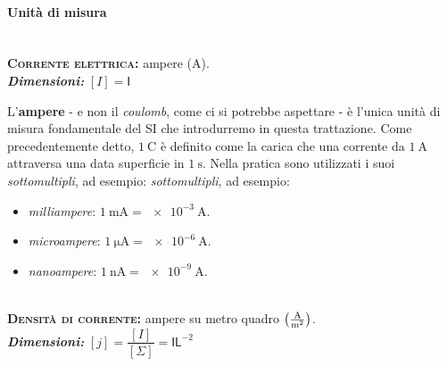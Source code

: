 \paragraph{Unità di misura}
\begin{units}~\\
	\textbf{\textsc{Corrente elettrica:}} ampere ($\unit{\ampere}$).\\
	\textit{\textbf{Dimensioni:}} $[I]=\mathsf{I}$
\end{units}
\noindent L'\textbf{ampere} - e non il \textit{coulomb}, come ci si potrebbe aspettare - è l'unica unità di misura fondamentale del SI che introdurremo in questa trattazione. Come precedentemente detto, $\SI{1}{\coulomb}$ è definito come la carica che una corrente da $\SI{1}{\ampere}$ attraversa una data superficie in $\SI{1}{\second}$.
Nella pratica sono utilizzati i suoi \textit{sottomultipli}, ad esempio:
\textit{sottomultipli}, ad esempio:
\begin{itemize}
	\item \textit{milliampere}: $\SI[per-mode = fraction,exponent-product=\ensuremath{\cdot}]{1}{\milli\ampere}=\SI[per-mode = fraction,exponent-product=\ensuremath{\cdot}]{e-3}{\ampere}$.
	\item \textit{microampere}: $\SI[per-mode = fraction,exponent-product=\ensuremath{\cdot}]{1}{\micro\ampere}=\SI[per-mode = fraction,exponent-product=\ensuremath{\cdot}]{e-6}{\ampere}$.
	\item \textit{nanoampere}: $\SI[per-mode = fraction,exponent-product=\ensuremath{\cdot}]{1}{\nano\ampere}=\SI[per-mode = fraction,exponent-product=\ensuremath{\cdot}]{e-9}{\ampere}$.
\end{itemize}
\begin{units}~\\
	\textbf{\textsc{Densità di corrente:}} ampere su metro quadro $\left(\unit[per-mode = fraction]{\ampere\per\square\meter}\right)$.\\
	\textit{\textbf{Dimensioni:}} $[j]=\dfrac{[I]}{[\Sigma]}=\mathsf{I}\mathsf{L}^{-2}$
\end{units}
